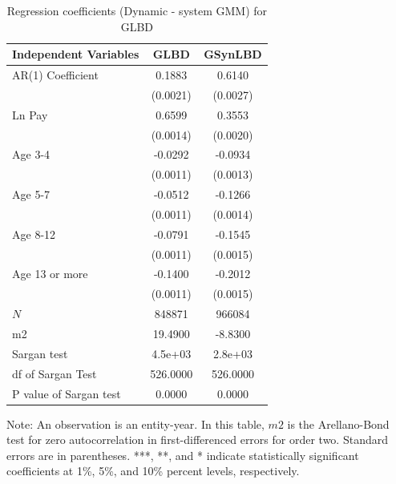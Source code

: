 \begin{table}[H]
  \centering
\caption{Regression coefficients (Dynamic - system GMM) for GLBD} \label{tab:Dynamic - system GMM_ger} \medskip
\renewcommand{\arraystretch}{1}
\setlength{\tabcolsep}{14pt}
\begin{tabular}{l|c| c}
\toprule
\textbf{Independent Variables}&\textbf{GLBD} &\textbf{GSynLBD}\\
\midrule
AR(1) Coefficient&   0.1883\sym{***}&   0.6140\sym{***}\\
          & (0.0021)         & (0.0027)         \\
[1em]
Ln Pay    &   0.6599\sym{***}&   0.3553\sym{***}\\
          & (0.0014)         & (0.0020)         \\
[1em]
Age 3-4   &  -0.0292\sym{***}&  -0.0934\sym{***}\\
          & (0.0011)         & (0.0013)         \\
[1em]
Age 5-7   &  -0.0512\sym{***}&  -0.1266\sym{***}\\
          & (0.0011)         & (0.0014)         \\
[1em]
Age 8-12  &  -0.0791\sym{***}&  -0.1545\sym{***}\\
          & (0.0011)         & (0.0015)         \\
[1em]
Age 13 or more&  -0.1400\sym{***}&  -0.2012\sym{***}\\
          & (0.0011)         & (0.0015)         \\
\hline
\(N\)     &   848871         &   966084         \\
m2        &  19.4900         &  -8.8300         \\
Sargan test&  4.5e+03         &  2.8e+03         \\
df of Sargan Test& 526.0000         & 526.0000         \\
P value of Sargan test&   0.0000         &   0.0000         \\
    \bottomrule
  \end{tabular} 
\begin{tablenotes}
\small
\item Note: An observation is an entity-year. In this table, $m2$ is the Arellano-Bond test for zero autocorrelation in first-differenced errors for order two. Standard errors are in parentheses. ***, **, and * indicate statistically significant coefficients at 1\%, 5\%, and 10\% percent levels, respectively.
 \end{tablenotes}
\end{table}











